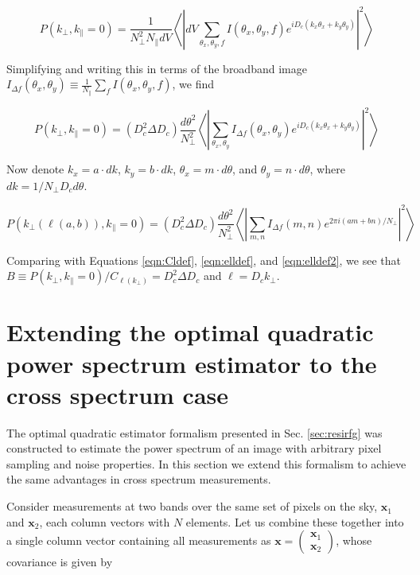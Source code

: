 \documentclass[numberedappendix]{emulateapj}
\newcommand{\xb}{\mathbf{x}}
\begin{document}
\begin{equation}
P(k_\perp,k_\parallel=0) =\frac{1}{N_\perp^2 N_\parallel dV}\left\langle\left|dV\sum_{\theta_x,\theta_y,f}I(\theta_x,\theta_y,f)e^{iD_c(k_x\theta_x+k_y\theta_y)}\right|^2\right\rangle
\end{equation}

Simplifying and writing this in terms of the broadband image $I_{\Delta f}(\theta_x,\theta_y)\equiv\frac{1}{N_\parallel}\sum_f  I(\theta_x,\theta_y,f)$, we find

\begin{equation}
P(k_\perp,k_\parallel=0) =(D_c^2 \Delta D_c)
\frac{d\theta^2}{N_\perp^2}\left\langle\left|\sum_{\theta_x,\theta_y}I_{\Delta f}(\theta_x,\theta_y)e^{iD_c(k_x\theta_x+k_y\theta_y)}\right|^2\right\rangle
\end{equation}

Now denote $k_x=a\cdot dk$, $k_y=b\cdot dk$, $\theta_x=m\cdot d\theta$, and $\theta_y=n\cdot d\theta$, where $dk = 1/N_\perp D_c d\theta$. 

\begin{equation}
P(k_\perp(\ell(a,b)),k_\parallel=0) =(D_c^2 \Delta D_c)
\frac{d\theta^2}{N_\perp^2}\left\langle\left|\sum_{m,n}I_{\Delta f}(m,n)e^{2\pi i(am + bn)/N_\perp}\right|^2\right\rangle
\end{equation}

Comparing with Equations \ref{eqn:Cldef}, \ref{eqn:elldef}, and \ref{eqn:elldef2}, we see that $B\equiv P(k_\perp,k_\parallel=0)/ C_{\ell(k_\perp)}=D_c^2 \Delta D_c$ and $\ell=D_c k_\perp$.


\section{Extending the optimal quadratic power spectrum estimator to the cross spectrum case}
\label{sec:optimalestimatorforcrossspectrum}

The optimal quadratic estimator formalism presented in Sec. \ref{sec:resirfg} was constructed to estimate the power spectrum of an image with arbitrary pixel sampling and noise properties. In this section we extend this formalism to achieve the same advantages in cross spectrum measurements. 

Consider measurements at two bands over the same set of pixels on the sky, $\xb_1$ and $\xb_2$, each column vectors with $N$ elements. Let us combine these together into a single column vector containing all measurements as $\xb=\left(\begin{matrix}\xb_1 \\ \xb_2  \end{matrix}\right)$, whose covariance is given by 
\end{document}
